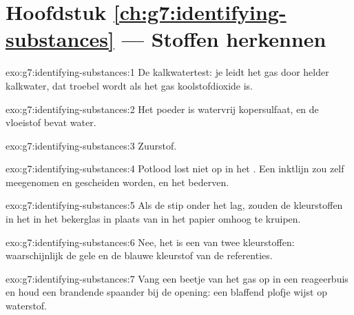 \section*{Hoofdstuk \ref{ch:g7:identifying-substances} --- Stoffen herkennen}

\begin{solution}{exo:g7:identifying-substances:1}
De kalkwatertest: je leidt het gas door helder kalkwater, dat troebel
wordt als het gas koolstofdioxide is.
\end{solution}

\begin{solution}{exo:g7:identifying-substances:2}
Het poeder is watervrij kopersulfaat, en de vloeistof bevat water.
\end{solution}

\begin{solution}{exo:g7:identifying-substances:3}
Zuurstof.
\end{solution}

\begin{solution}{exo:g7:identifying-substances:4}
Potlood lost niet op in het . Een inktlijn zou zelf
meegenomen en gescheiden worden, en het  bederven.
\end{solution}

\begin{solution}{exo:g7:identifying-substances:5}
Als de stip onder het  lag, zouden de kleurstoffen in het
 in het bekerglas  in plaats van in het papier omhoog
te kruipen.
\end{solution}

\begin{solution}{exo:g7:identifying-substances:6}
Nee, het is een  van twee kleurstoffen: waarschijnlijk de gele en
de blauwe kleurstof van de referenties.
\end{solution}

\begin{solution}{exo:g7:identifying-substances:7}
Vang een beetje van het gas op in een reageerbuis en houd een brandende
spaander bij de opening: een blaffend plofje wijst op waterstof.
\end{solution}

